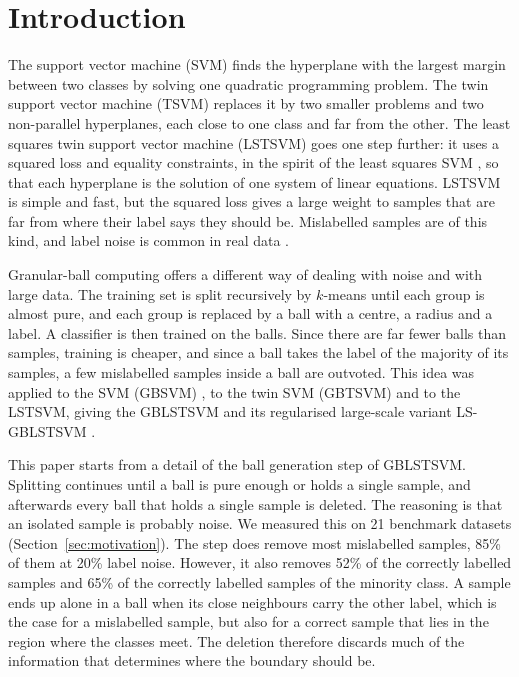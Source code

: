 \documentclass[preprint,12pt]{elsarticle}
\begin{document}
\section{Introduction}
\label{sec:intro}

The support vector machine (SVM) \cite{cortes1995} finds the hyperplane with the largest margin between two classes by solving one quadratic programming problem. The twin support vector machine (TSVM) \cite{jayadeva2007} replaces it by two smaller problems and two non-parallel hyperplanes, each close to one class and far from the other. The least squares twin support vector machine (LSTSVM) \cite{kumar2009} goes one step further: it uses a squared loss and equality constraints, in the spirit of the least squares SVM \cite{suykens1999}, so that each hyperplane is the solution of one system of linear equations. LSTSVM is simple and fast, but the squared loss gives a large weight to samples that are far from where their label says they should be. Mislabelled samples are of this kind, and label noise is common in real data \cite{frenay2014}.

Granular-ball computing \cite{xia2019} offers a different way of dealing with noise and with large data. The training set is split recursively by $k$-means until each group is almost pure, and each group is replaced by a ball with a centre, a radius and a label. A classifier is then trained on the balls. Since there are far fewer balls than samples, training is cheaper, and since a ball takes the label of the majority of its samples, a few mislabelled samples inside a ball are outvoted. This idea was applied to the SVM (GBSVM) \cite{xia2022gbsvm}, to the twin SVM (GBTSVM) \cite{quadir2024gbtsvm} and to the LSTSVM, giving the GBLSTSVM and its regularised large-scale variant LS-GBLSTSVM \cite{tanveer2024gblstsvm}.

This paper starts from a detail of the ball generation step of GBLSTSVM. Splitting continues until a ball is pure enough or holds a single sample, and afterwards every ball that holds a single sample is deleted. The reasoning is that an isolated sample is probably noise. We measured this on 21 benchmark datasets (Section~\ref{sec:motivation}). The step does remove most mislabelled samples, 85\% of them at 20\% label noise. However, it also removes 52\% of the correctly labelled samples and 65\% of the correctly labelled samples of the minority class. A sample ends up alone in a ball when its close neighbours carry the other label, which is the case for a mislabelled sample, but also for a correct sample that lies in the region where the classes meet. The deletion therefore discards much of the information that determines where the boundary should be.
\end{document}
